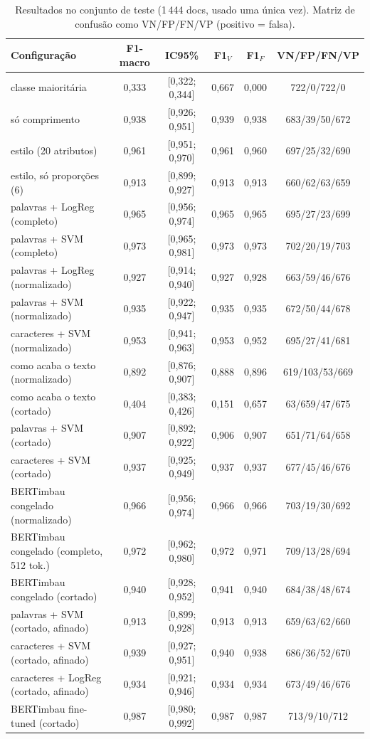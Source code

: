 \begin{table}[t]\centering\scriptsize
\caption{Resultados no conjunto de teste (1\,444 docs, usado uma única vez). Matriz de confusão como VN/FP/FN/VP (positivo = falsa).}\label{tab:test}
\begin{tabular}{lccccc}
\toprule
Configuração & F1-macro & IC95\% & F1$_V$ & F1$_F$ & VN/FP/FN/VP \\
\midrule
classe maioritária & 0,333 & [0,322; 0,344] & 0,667 & 0,000 & 722/0/722/0 \\
só comprimento & 0,938 & [0,926; 0,951] & 0,939 & 0,938 & 683/39/50/672 \\
estilo (20 atributos) & 0,961 & [0,951; 0,970] & 0,961 & 0,960 & 697/25/32/690 \\
estilo, só proporções (6) & 0,913 & [0,899; 0,927] & 0,913 & 0,913 & 660/62/63/659 \\
palavras + LogReg (completo) & 0,965 & [0,956; 0,974] & 0,965 & 0,965 & 695/27/23/699 \\
palavras + SVM (completo) & 0,973 & [0,965; 0,981] & 0,973 & 0,973 & 702/20/19/703 \\
palavras + LogReg (normalizado) & 0,927 & [0,914; 0,940] & 0,927 & 0,928 & 663/59/46/676 \\
palavras + SVM (normalizado) & 0,935 & [0,922; 0,947] & 0,935 & 0,935 & 672/50/44/678 \\
caracteres + SVM (normalizado) & 0,953 & [0,941; 0,963] & 0,953 & 0,952 & 695/27/41/681 \\
como acaba o texto (normalizado) & 0,892 & [0,876; 0,907] & 0,888 & 0,896 & 619/103/53/669 \\
como acaba o texto (cortado) & 0,404 & [0,383; 0,426] & 0,151 & 0,657 & 63/659/47/675 \\
palavras + SVM (cortado) & 0,907 & [0,892; 0,922] & 0,906 & 0,907 & 651/71/64/658 \\
caracteres + SVM (cortado) & 0,937 & [0,925; 0,949] & 0,937 & 0,937 & 677/45/46/676 \\
BERTimbau congelado (normalizado) & 0,966 & [0,956; 0,974] & 0,966 & 0,966 & 703/19/30/692 \\
BERTimbau congelado (completo, 512 tok.) & 0,972 & [0,962; 0,980] & 0,972 & 0,971 & 709/13/28/694 \\
BERTimbau congelado (cortado) & 0,940 & [0,928; 0,952] & 0,941 & 0,940 & 684/38/48/674 \\
palavras + SVM (cortado, afinado) & 0,913 & [0,899; 0,928] & 0,913 & 0,913 & 659/63/62/660 \\
caracteres + SVM (cortado, afinado) & 0,939 & [0,927; 0,951] & 0,940 & 0,938 & 686/36/52/670 \\
caracteres + LogReg (cortado, afinado) & 0,934 & [0,921; 0,946] & 0,934 & 0,934 & 673/49/46/676 \\
BERTimbau fine-tuned (cortado) & 0,987 & [0,980; 0,992] & 0,987 & 0,987 & 713/9/10/712 \\
\bottomrule
\end{tabular}
\end{table}
